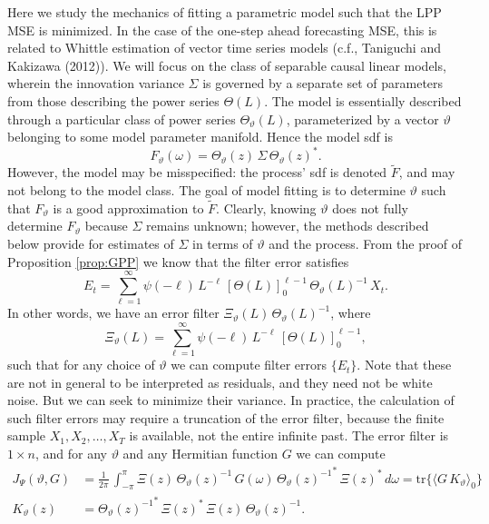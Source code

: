 \documentclass[a4paper]{book}
\begin{document}
 Here we study the mechanics of fitting a parametric model such that the LPP MSE
 is minimized.  In the case of the one-step ahead forecasting MSE, this is related
 to Whittle estimation of vector time series models (c.f.,  Taniguchi and Kakizawa (2012)).
  We will focus on the class of separable causal linear models, wherein the innovation variance
 $\Sigma$ is governed by a separate set of parameters from those describing the power
 series $\Theta (L)$.  The model is essentially described through a particular class of
 power series   $\Theta_{\vartheta} (L)$, parameterized by a vector $\vartheta $
  belonging to some model  parameter manifold.    Hence the model sdf is
\[
  F_{\vartheta} (\omega) = \Theta_{\vartheta} (z) \, \Sigma \,  { \Theta_{\vartheta} (z) }^*.
\]
 However, the model may be misspecified: the process' sdf is denoted $\widetilde{F}$, 
  and may not
 belong to the model class.  The goal of model fitting is to determine $\vartheta$ 
  such that
 $F_{\vartheta}$ is a good approximation to $\widetilde{F}$.  
 Clearly, knowing $\vartheta$ does not
 fully determine $F_{\vartheta}$ because $\Sigma$ remains unknown; however, the methods
 described below provide for estimates of $\Sigma$ in terms of $\vartheta$ and the process.
 From the proof of Proposition \ref{prop:GPP} we know that the filter error satisfies
\[
  E_t = \sum_{\ell =1 }^{\infty} \psi (-\ell) \, L^{-\ell} \,  {[ \Theta (L) ]}_0^{\ell - 1} \, 
   { \Theta_{\vartheta} (L) }^{-1} \, X_t.
\] 
 In other words, we have an error filter $ \Xi_{\vartheta} (L) \,  
  { \Theta_{\vartheta} (L) }^{-1}  $,
 where
\[
  \Xi_{\vartheta} (L)  = \sum_{\ell =1 }^{\infty} \psi (-\ell) \,  L^{-\ell} \,
   {[ \Theta (L) ]}_0^{\ell - 1},
\]
  such that for any choice of $\vartheta $ we can compute filter errors $\{ E_t \}$.
 Note that these are not in general to be interpreted as residuals, and they need not be white noise.
  But we can seek to minimize their variance.  In practice,
 the calculation of such filter errors  may require a truncation of the error filter, because the finite
 sample $X_1, X_2, \ldots, X_T$ is available, not the entire infinite past.  The error filter is
 $1 \times n$, and for any $\vartheta $ and any Hermitian function $G$ we can compute
\begin{align*}
  J_{\Psi} (\vartheta, G) & 	= \frac{1}{2 \pi} \, \int_{-\pi}^{\pi} \Xi (z) \,
  { \Theta_{\vartheta} (z) }^{-1} \, G(\omega)
  \,  {{ \Theta_{\vartheta} (z) }^{-1} }^* \, { \Xi (z) }^* \, d\omega  = \mbox{tr} \{ 
 { \langle G \, K_{\vartheta} \rangle }_0 \} \\
   K_{\vartheta} (z) & =  {{ \Theta_{\vartheta} (z) }^{-1} }^* \, { \Xi (z) }^* \,  \Xi (z) \, 
 { \Theta_{\vartheta} (z) }^{-1}.
\end{align*}
\end{document}
